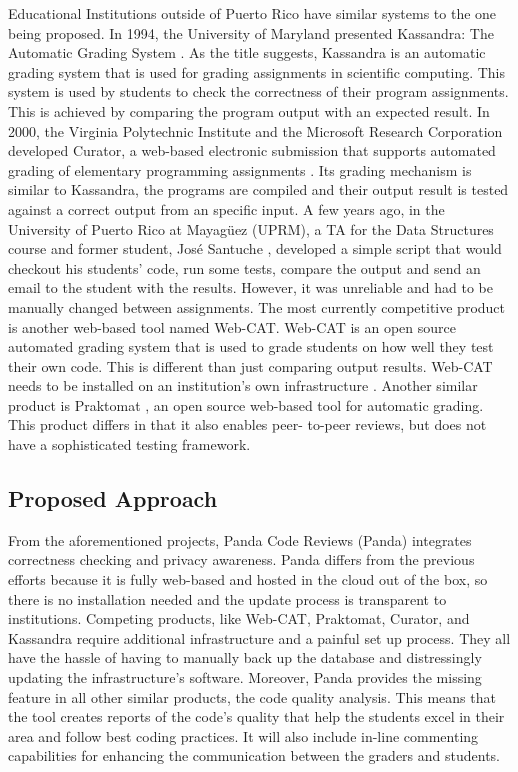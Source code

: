 Educational Institutions outside of Puerto Rico have similar systems to the one
being proposed. In 1994, the University of Maryland presented Kassandra: The
Automatic Grading System \cite{Matt1994}. As the title suggests, Kassandra is an
automatic grading system that is used for grading assignments in scientific
computing. This system is used by students to check the correctness of their
program assignments. This is achieved by comparing the program output with an
expected result. In 2000, the Virginia Polytechnic Institute and the Microsoft
Research Corporation developed Curator, a web-based electronic submission that
supports automated grading of elementary programming assignments \cite{Curator}.
Its grading mechanism is similar to Kassandra, the programs are compiled and
their output result is tested against a correct output from an specific input.
A few years ago, in the University of Puerto Rico at Mayagüez (UPRM), a TA for the Data 
Structures
course and former student, José Santuche \cite{Santuche}, developed a simple
script that would checkout his students' code, run some tests, compare the
output and send an email to the student with the results. However, it was
unreliable and had to be manually changed between assignments. The most
currently competitive product is another web-based tool named Web-CAT. Web-CAT
is an open source automated grading system that is used to grade students on how
well they test their own code. This is different than just comparing output results. 
Web-CAT needs to be installed on an institution's own infrastructure \cite{WebCat}.
Another similar product is Praktomat \cite{Praktomat}, an open source web-based
tool for automatic grading. This product differs in that it also enables peer-
to-peer reviews, but does not have a sophisticated testing framework.


\subsection{Proposed Approach}

From the aforementioned projects, Panda Code Reviews (Panda) integrates
correctness checking and privacy awareness. Panda differs from the previous
efforts because it is fully web-based and hosted in the cloud out of the box, so
there is no installation needed and the update process is transparent to
institutions. Competing products, like Web-CAT, Praktomat, Curator, and
Kassandra require additional infrastructure and a painful set up process. They
all have the hassle of having to manually back up the database and distressingly
updating the infrastructure's software. Moreover, Panda provides the missing
feature in all other similar products, the code quality analysis. This means that the tool creates
reports of the code's quality that help the students excel in their area and
follow best coding practices. It will also include in-line commenting
capabilities for enhancing the communication between the graders and students.

